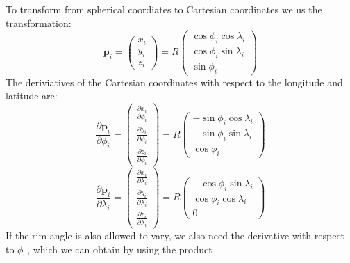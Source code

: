 \documentclass{article}
\renewcommand{\vec}[1]{\mathbf{#1}}
\begin{document}
To transform from spherical coordiates to Cartesian coordinates we us
the transformation:
\begin{equation}
  \vec{p}_i = 
  \label{retistruct-algorithm:eq:1}
  \left(
    \begin{array}{c}
    x_i\\ y_i\\ z_i
    \end{array}
  \right) =
  R\left(
    \begin{array}{c}
      \cos\phi_i\cos\lambda_i \\
      \cos\phi_i\sin\lambda_i\\
      \sin\phi_i 
    \end{array}\right)
\end{equation}
The deriviatives of the Cartesian coordinates with respect to the
longitude and latitude are:
\begin{equation}
  \frac{\partial\vec{p}_i}{\partial\phi_i} = 
  \left(
    \begin{array}{c}
    \frac{\partial x_i}{\partial\phi_i}\\ \frac{\partial y_i}{\partial\phi_i}\\ \frac{\partial z_i}{\partial\phi_i}
    \end{array}
  \right) =
  R\left(
    \begin{array}{c}
      -\sin\phi_i\cos\lambda_i \\
      -\sin\phi_i\sin\lambda_i\\
      \cos\phi_i 
    \end{array}\right)
\end{equation}
\begin{equation}
  \frac{\partial\vec{p}_i}{\partial\lambda_i} = 
  \left(
    \begin{array}{c}
    \frac{\partial x_i}{\partial\lambda_i}\\ \frac{\partial y_i}{\partial\lambda_i}\\ \frac{\partial z_i}{\partial\lambda_i}
    \end{array}
  \right) =
  R\left(
    \begin{array}{c}
      -\cos\phi_i\sin\lambda_i \\
      \cos\phi_i\cos\lambda_i\\
      0
    \end{array}\right)
\end{equation}
If the rim angle is also allowed to vary, we also need the derivative
with respect to $\phi_0$, which we can obtain by using the product
\end{document}
